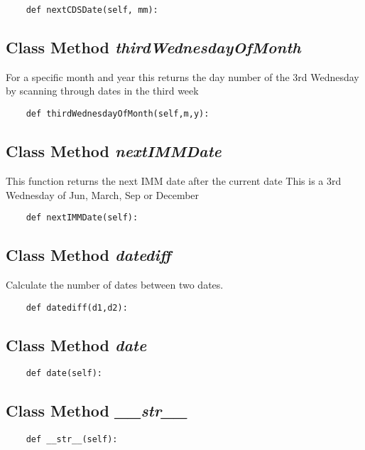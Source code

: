 \documentclass[twoside,11pt]{book}
\begin{document}
\begin{lstlisting}
    def nextCDSDate(self, mm):
\end{lstlisting}

\subsection{Class Method {\it thirdWednesdayOfMonth}}
For a specific month and year this returns the day number of the 3rd Wednesday by scanning through dates in the third week 

\begin{lstlisting}
    def thirdWednesdayOfMonth(self,m,y):
\end{lstlisting}

\subsection{Class Method {\it nextIMMDate}}
This function returns the next IMM date after the current date This is a 3rd Wednesday of Jun, March, Sep or December 

\begin{lstlisting}
    def nextIMMDate(self):
\end{lstlisting}

\subsection{Class Method {\it datediff}}
Calculate the number of dates between two dates. 

\begin{lstlisting}
    def datediff(d1,d2):
\end{lstlisting}

\subsection{Class Method {\it date}}


\begin{lstlisting}
    def date(self):
\end{lstlisting}

\subsection{Class Method {\it \_\_str\_\_}}


\begin{lstlisting}
    def __str__(self):
\end{lstlisting}
\end{document}
